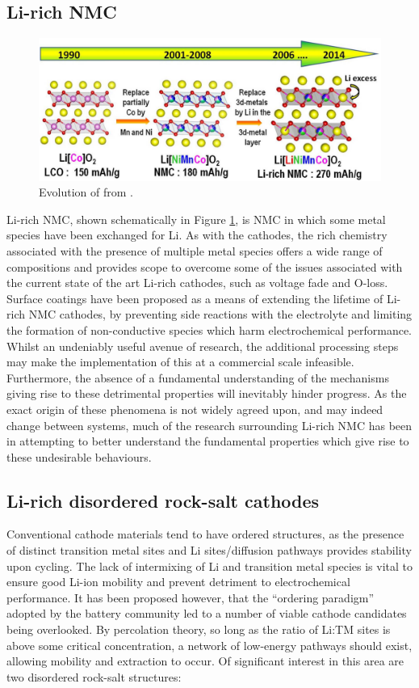 \subsection{Li-rich NMC}
\begin{figure}
\centering
\includegraphics[width=\linewidth]{figures/structures/tarasconNMC}
\caption{Evolution of  from .\cite{Rozier2015}} 
\label{fig:tarasconNMC}
\end{figure}

Li-rich NMC, shown schematically in Figure \ref{fig:tarasconNMC}, is NMC in which some metal species have been exchanged for Li.
As with the  cathodes, the rich chemistry associated with the presence of multiple metal species offers a wide range of compositions and provides scope to overcome some of the issues associated with the current state of the art Li-rich cathodes, such as voltage fade and O-loss.
Surface coatings have been proposed as a means of extending the lifetime of Li-rich NMC cathodes, by preventing side reactions with the electrolyte and limiting the formation of non-conductive species which harm electrochemical performance.
Whilst an undeniably useful avenue of research, the additional processing steps may make the implementation of this at a commercial scale infeasible.
Furthermore, the absence of a fundamental understanding of the mechanisms giving rise to these detrimental properties will inevitably hinder progress.
As the exact origin of these phenomena is not widely agreed upon, and may indeed change between systems, much of the research surrounding Li-rich NMC has been in attempting to better understand the fundamental properties which give rise to these undesirable behaviours.


\newpage
\subsection{Li-rich disordered rock-salt cathodes}
Conventional cathode materials tend to have ordered structures, as the presence of distinct transition metal sites and Li sites/diffusion pathways provides stability upon cycling.
The lack of intermixing of Li and transition metal species is vital to ensure good Li-ion mobility and prevent detriment to electrochemical performance.
It has been proposed however, that the ``ordering paradigm'' adopted by the battery community led to a number of viable cathode candidates being overlooked. \cite{Casimir2014}
By percolation theory, so long as the ratio of Li:TM sites is above some critical concentration, a network of low-energy pathways should exist, allowing mobility and extraction to occur.\cite{Urban2014}
Of significant interest in this area are two disordered rock-salt structures:

